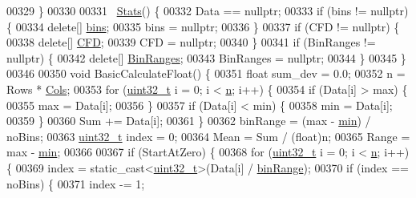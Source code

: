 \begin{DoxyCode}
00329   \}
00330 
00331   ~\hyperlink{class_soil_math_1_1_stats_aa9727b7ea39b46f8a010a7b710b26d83}{Stats}() \{
00332     Data == \textcolor{keyword}{nullptr};
00333     \textcolor{keywordflow}{if} (bins != \textcolor{keyword}{nullptr}) \{
00334       \textcolor{keyword}{delete}[] \hyperlink{class_soil_math_1_1_stats_a00778b298b1ebb335eb0c4eed69e471c}{bins};
00335       bins = \textcolor{keyword}{nullptr};
00336     \}
00337     \textcolor{keywordflow}{if} (CFD != \textcolor{keyword}{nullptr}) \{
00338       \textcolor{keyword}{delete}[] \hyperlink{class_soil_math_1_1_stats_a0d68c6fb52cb445c413aa187038bb1fe}{CFD};
00339       CFD = \textcolor{keyword}{nullptr};
00340     \}
00341     \textcolor{keywordflow}{if} (BinRanges != \textcolor{keyword}{nullptr}) \{
00342       \textcolor{keyword}{delete}[] \hyperlink{class_soil_math_1_1_stats_a0d452c96b6f499f054432bd3b52d1302}{BinRanges};
00343       BinRanges = \textcolor{keyword}{nullptr};
00344     \}
00345   \}
00346 
00350   \textcolor{keywordtype}{void} BasicCalculateFloat() \{
00351     \textcolor{keywordtype}{float} sum\_dev = 0.0;
00352     n = Rows * \hyperlink{class_soil_math_1_1_stats_a971f1ec23c32137805c4577f05454d83}{Cols};
00353     \textcolor{keywordflow}{for} (\hyperlink{_soil_math_types_8h_a435d1572bf3f880d55459d9805097f62}{uint32\_t} i = 0; i < \hyperlink{class_soil_math_1_1_stats_a7bc57af334b68253832ebac17f85d091}{n}; i++) \{
00354       \textcolor{keywordflow}{if} (Data[i] > max) \{
00355         max = Data[i];
00356       \}
00357       \textcolor{keywordflow}{if} (Data[i] < min) \{
00358         min = Data[i];
00359       \}
00360       Sum += Data[i];
00361     \}
00362     binRange = (max - \hyperlink{class_soil_math_1_1_stats_aa44c07a23b1c2ce0f0407e7cee4f39a9}{min}) / noBins;
00363     \hyperlink{_soil_math_types_8h_a435d1572bf3f880d55459d9805097f62}{uint32\_t} index = 0;
00364     Mean = Sum / (float)n;
00365     Range = max - \hyperlink{class_soil_math_1_1_stats_aa44c07a23b1c2ce0f0407e7cee4f39a9}{min};
00366 
00367     \textcolor{keywordflow}{if} (StartAtZero) \{
00368       \textcolor{keywordflow}{for} (\hyperlink{_soil_math_types_8h_a435d1572bf3f880d55459d9805097f62}{uint32\_t} i = 0; i < \hyperlink{class_soil_math_1_1_stats_a7bc57af334b68253832ebac17f85d091}{n}; i++) \{
00369         index = \textcolor{keyword}{static\_cast<}\hyperlink{_soil_math_types_8h_a435d1572bf3f880d55459d9805097f62}{uint32\_t}\textcolor{keyword}{>}(Data[i] / \hyperlink{class_soil_math_1_1_stats_a00be1d2a705a8aba532fbe726001bbb2}{binRange});
00370         \textcolor{keywordflow}{if} (index == noBins) \{
00371           index -= 1;

\end{DoxyCode}

